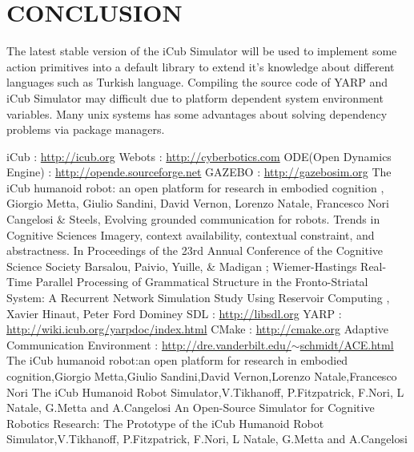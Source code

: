 \documentclass[reqno,12pt,oneside]{report}
\begin{document}
\chapter{CONCLUSION}
The latest stable version of the iCub Simulator will be used to implement some action primitives into a default library to extend it's knowledge about different languages such as Turkish language. Compiling the source code of YARP and iCub Simulator may difficult due to platform dependent system environment variables. Many unix systems has some advantages about solving dependency problems via package managers.

\begin{thebibliography}{9}
iCub : \underline{http://icub.org}
Webots : \underline{http://cyberbotics.com}
ODE(Open Dynamics Engine) : \underline{http://opende.sourceforge.net}
GAZEBO : \underline{http://gazebosim.org}
The iCub humanoid robot:
an open platform for research in embodied cognition , Giorgio Metta, Giulio Sandini, David Vernon, Lorenzo Natale, Francesco Nori
Cangelosi \& Steels, Evolving grounded communication for robots. Trends in Cognitive Sciences
Imagery, context availability,
contextual constraint, and abstractness. In Proceedings of the 23rd Annual Conference of the Cognitive Science Society Barsalou, Paivio, Yuille, \& Madigan ; Wiemer-Hastings
Real-Time Parallel Processing of Grammatical Structure in the Fronto-Striatal System: A Recurrent Network Simulation Study Using Reservoir Computing , Xavier Hinaut, Peter Ford Dominey
SDL : \underline{http://libsdl.org}
YARP : \underline{http://wiki.icub.org/yarpdoc/index.html}
CMake : \underline{http://cmake.org} 
Adaptive Communication Environment : \underline{http://dre.vanderbilt.edu/$\sim$schmidt/ACE.html}
The iCub humanoid robot:an open platform for research in embodied cognition,Giorgio Metta,Giulio Sandini,David Vernon,Lorenzo Natale,Francesco Nori
The iCub Humanoid Robot Simulator,V.Tikhanoff, P.Fitzpatrick, F.Nori, L Natale, G.Metta and A.Cangelosi
An Open-Source Simulator for Cognitive Robotics Research: The Prototype of the iCub Humanoid Robot Simulator,V.Tikhanoff, P.Fitzpatrick, F.Nori, L Natale, G.Metta and A.Cangelosi
\end{thebibliography}
\newpage
\end{document}
